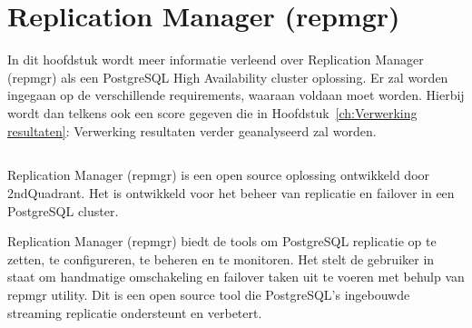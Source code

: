 
\chapter{Replication Manager (repmgr)}
\label{ch:Replication Manager (repmgr)}

In dit hoofdstuk wordt meer informatie verleend over Replication Manager (repmgr) als een PostgreSQL High Availability cluster oplossing. Er zal worden ingegaan op de verschillende requirements, waaraan voldaan moet worden. Hierbij wordt dan telkens ook een score gegeven die in Hoofdstuk~\ref{ch:Verwerking resultaten}: Verwerking resultaten verder geanalyseerd zal worden.

\section{}
\label{sec:Inleiding tot Replication Manager (repmgr)}

Replication Manager (repmgr) is een open source oplossing ontwikkeld door 2ndQuadrant. Het is ontwikkeld voor het beheer van replicatie en failover in een PostgreSQL cluster.

Replication Manager (repmgr) biedt de tools om PostgreSQL replicatie op te zetten, te configureren, te beheren en te monitoren. Het stelt de gebruiker in staat om handmatige omschakeling en failover taken uit te voeren met behulp van repmgr utility. Dit is een open source tool die PostgreSQL's ingebouwde streaming replicatie ondersteunt en verbetert.

\section{}
\label{sec:Requirements}

\subsection{}
\label{subsec:Must have}



